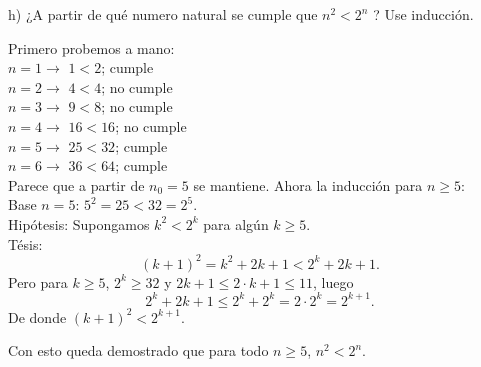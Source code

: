 h) ¿A partir de qué numero natural se cumple que \( n^{2}<2^{n} \) ? Use inducción.

Primero probemos a mano: \\
$n=1 \rightarrow$ \(1<2\); cumple \\
$n=2 \rightarrow$ \(4<4\); no cumple \\
$n=3 \rightarrow$ \(9<8\); no cumple \\
$n=4 \rightarrow$ \(16<16\); no cumple \\
$n=5 \rightarrow$ \(25<32\); cumple \\ 
$n=6 \rightarrow$ \(36<64\); cumple \\
Parece que a partir de \(n_{0}=5\) se mantiene. Ahora la inducción para \(n\ge5\): \\

Base \(n=5\): \(5^{2}=25<32=2^{5}\). \\
Hipótesis: Supongamos \(k^{2}<2^{k}\) para algún \(k\ge5\). \\
Tésis:
\[
     (k+1)^{2} = k^{2} +2k+1 < 2^{k} +2k+1.
   \]
Pero para \(k\ge5\), \(2^{k}\ge32\) y \(2k+1\le2\cdot k+1\le11\), luego
\[
     2^{k}+2k+1 \le 2^{k}+2^{k} =2\cdot2^{k} =2^{k+1}.
   \]
De donde \((k+1)^{2}<2^{k+1}\).

Con esto queda demostrado que para todo \(n\ge5\), \(n^{2}<2^{n}\). \\\\